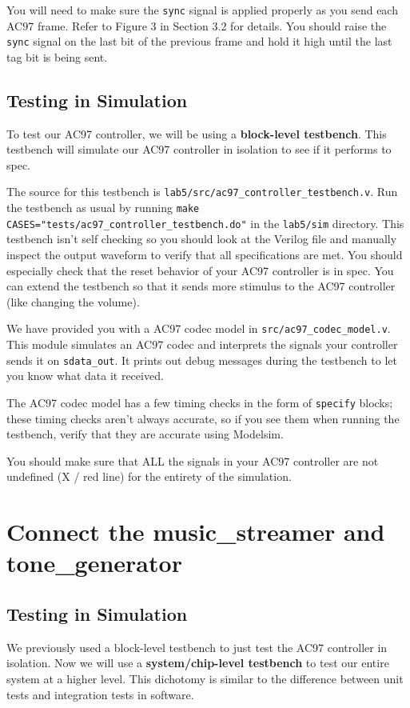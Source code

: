 \documentclass[11pt]{article}
\begin{document}
You will need to make sure the \verb|sync| signal is applied properly as you send each AC97 frame. Refer to Figure 3 in Section 3.2 for details. You should raise the \verb|sync| signal on the last bit of the previous frame and hold it high until the last tag bit is being sent.

\subsection{Testing in Simulation}
To test our AC97 controller, we will be using a \textbf{block-level testbench}. This testbench will simulate our AC97 controller in isolation to see if it performs to spec.

The source for this testbench is \verb|lab5/src/ac97_controller_testbench.v|. Run the testbench as usual by running \verb|make CASES="tests/ac97_controller_testbench.do"| in the \verb|lab5/sim| directory. This testbench isn't self checking so you should look at the Verilog file and manually inspect the output waveform to verify that all specifications are met. You should especially check that the reset behavior of your AC97 controller is in spec. You can extend the testbench so that it sends more stimulus to the AC97 controller (like changing the volume).

We have provided you with a AC97 codec model in \verb|src/ac97_codec_model.v|. This module simulates an AC97 codec and interprets the signals your controller sends it on \verb|sdata_out|. It prints out debug messages during the testbench to let you know what data it received.

The AC97 codec model has a few timing checks in the form of \verb|specify| blocks; these timing checks aren't always accurate, so if you see them when running the testbench, verify that they are accurate using Modelsim.

You should make sure that ALL the signals in your AC97 controller are not undefined (X / red line) for the entirety of the simulation.

\section{Connect the music\_streamer and tone\_generator}

\subsection{Testing in Simulation}
We previously used a block-level testbench to just test the AC97 controller in isolation. Now we will use a \textbf{system/chip-level testbench} to test our entire system at a higher level. This dichotomy is similar to the difference between unit tests and integration tests in software.
\end{document}
